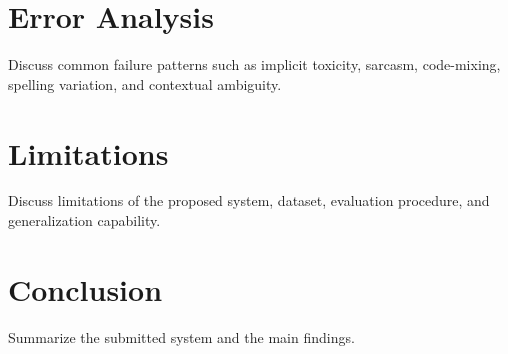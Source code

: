 \documentclass[10pt,a4paper]{article}
\begin{document}

\section{Error Analysis}

Discuss common failure patterns such as implicit toxicity,
sarcasm, code-mixing, spelling variation, and contextual
ambiguity.



\section{Limitations}

Discuss limitations of the proposed system, dataset,
evaluation procedure, and generalization capability.






\section{Conclusion}

Summarize the submitted system and the main findings.






\end{document}
